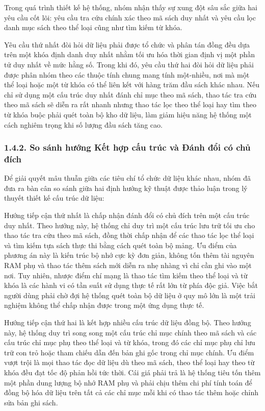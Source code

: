 \documentclass[14pt,a4paper]{extarticle}
\begin{document}
Trong quá trình thiết kế hệ thống, nhóm nhận thấy sự xung đột sâu sắc giữa hai yêu cầu cốt lõi: yêu cầu tra cứu chính xác theo mã sách duy nhất và yêu cầu lọc danh mục sách theo thể loại cũng như tìm kiếm từ khóa.

Yêu cầu thứ nhất đòi hỏi dữ liệu phải được tổ chức và phân tán đồng đều dựa trên một khóa định danh duy nhất nhằm tối ưu hóa thời gian định vị một phần tử duy nhất về mức hằng số. Trong khi đó, yêu cầu thứ hai đòi hỏi dữ liệu phải được phân nhóm theo các thuộc tính chung mang tính một-nhiều, nơi mà một thể loại hoặc một từ khóa có thể liên kết với hàng trăm đầu sách khác nhau. Nếu chỉ sử dụng một cấu trúc duy nhất đánh chỉ mục theo mã sách, thao tác tra cứu theo mã sách sẽ diễn ra rất nhanh nhưng thao tác lọc theo thể loại hay tìm theo từ khóa buộc phải quét toàn bộ kho dữ liệu, làm giảm hiệu năng hệ thống một cách nghiêm trọng khi số lượng đầu sách tăng cao.

\subsubsection*{1.4.2. So sánh hướng Kết hợp cấu trúc và Đánh đổi có chủ đích}

Để giải quyết mâu thuẫn giữa các tiêu chí tổ chức dữ liệu khác nhau, nhóm đã đưa ra bàn cân so sánh giữa hai định hướng kỹ thuật được thảo luận trong lý thuyết thiết kế cấu trúc dữ liệu:

Hướng tiếp cận thứ nhất là chấp nhận đánh đổi có chủ đích trên một cấu trúc duy nhất. Theo hướng này, hệ thống chỉ duy trì một cấu trúc lưu trữ tối ưu cho thao tác tra cứu theo mã sách, đồng thời chấp nhận để các thao tác lọc thể loại và tìm kiếm tựa sách thực thi bằng cách quét toàn bộ mảng. Ưu điểm của phương án này là kiến trúc bộ nhớ cực kỳ đơn giản, không tốn thêm tài nguyên RAM phụ và thao tác thêm sách mới diễn ra nhẹ nhàng vì chỉ cần ghi vào một nơi. Tuy nhiên, nhược điểm chí mạng là thao tác tìm kiếm theo thể loại và từ khóa là các hành vi có tần suất sử dụng thực tế rất lớn từ phía độc giả. Việc bắt người dùng phải chờ đợi hệ thống quét toàn bộ dữ liệu ở quy mô lớn là một trải nghiệm không thể chấp nhận được trong một ứng dụng thực tế.

Hướng tiếp cận thứ hai là kết hợp nhiều cấu trúc dữ liệu đồng bộ. Theo hướng này, hệ thống duy trì song song một cấu trúc chỉ mục chính theo mã sách và các cấu trúc chỉ mục phụ theo thể loại và từ khóa, trong đó các chỉ mục phụ chỉ lưu trữ con trỏ hoặc tham chiếu dẫn đến bản ghi gốc trong chỉ mục chính. Ưu điểm vượt trội là mọi thao tác đọc dữ liệu dù theo mã sách, theo thể loại hay theo từ khóa đều đạt tốc độ phản hồi tức thời. Cái giá phải trả là hệ thống tiêu tốn thêm một phần dung lượng bộ nhớ RAM phụ và phải chịu thêm chi phí tính toán để đồng bộ hóa dữ liệu trên tất cả các chỉ mục mỗi khi có thao tác thêm hoặc chỉnh sửa bản ghi sách.
\end{document}
